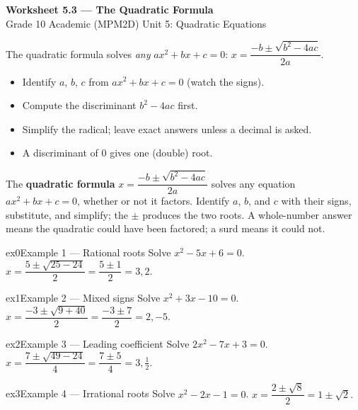 \documentclass[11pt]{article}
\begin{document}
\begin{center}
{\LARGE\bfseries\color{titleblue}Worksheet 5.3 --- The Quadratic Formula}\\[2pt]
{\small Grade 10 Academic (MPM2D) \textperiodcentered{} Unit 5: Quadratic Equations}
\end{center}

\begin{ideabox}
The quadratic formula solves \emph{any} $ax^2+bx+c=0$: $x=\dfrac{-b\pm\sqrt{b^2-4ac}}{2a}$.
\begin{itemize}[leftmargin=*,itemsep=2pt]
  \item Identify $a$, $b$, $c$ from $ax^2+bx+c=0$ (watch the signs).
  \item Compute the discriminant $b^2-4ac$ first.
  \item Simplify the radical; leave exact answers unless a decimal is asked.
  \item A discriminant of $0$ gives one (double) root.
\end{itemize}
\end{ideabox}

\begin{learnbox}
The \textbf{quadratic formula} $x=\dfrac{-b\pm\sqrt{b^2-4ac}}{2a}$ solves any equation $ax^2+bx+c=0$, whether or not it factors.
Identify $a$, $b$, and $c$ with their signs, substitute, and simplify; the $\pm$ produces the two roots.
A whole-number answer means the quadratic could have been factored; a surd means it could not.
\end{learnbox}


\begin{example}{ex0}{Example 1 --- Rational roots}
Solve $x^2-5x+6=0$.
\soln $x=\dfrac{5\pm\sqrt{25-24}}{2}=\dfrac{5\pm1}{2}=3,2.$
\end{example}

\begin{example}{ex1}{Example 2 --- Mixed signs}
Solve $x^2+3x-10=0$.
\soln $x=\dfrac{-3\pm\sqrt{9+40}}{2}=\dfrac{-3\pm7}{2}=2,-5.$
\end{example}

\begin{example}{ex2}{Example 3 --- Leading coefficient}
Solve $2x^2-7x+3=0$.
\soln $x=\dfrac{7\pm\sqrt{49-24}}{4}=\dfrac{7\pm5}{4}=3,\tfrac12.$
\end{example}

\begin{example}{ex3}{Example 4 --- Irrational roots}
Solve $x^2-2x-1=0$.
\soln $x=\dfrac{2\pm\sqrt{8}}{2}=1\pm\sqrt2.$
\end{example}
\end{document}
